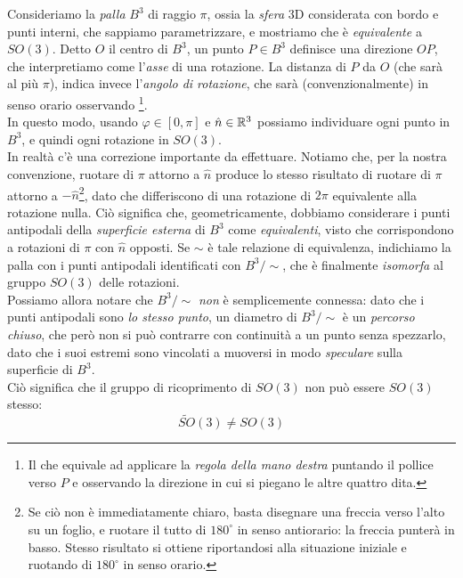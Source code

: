 \documentclass[../../FisicaTeorica.tex]{subfiles}
\begin{document}
Consideriamo la \textit{palla} $B^3$ di raggio $\pi$, ossia la \textit{sfera} 3D considerata con bordo e punti interni, che sappiamo parametrizzare, e mostriamo che è \textit{equivalente} a $SO(3)$. Detto $O$ il centro di $B^3$, un punto $P \in B^3$ definisce una direzione $OP$, che interpretiamo come l'\textit{asse} di una rotazione. La distanza di $P$ da $O$ (che sarà al più $\pi$), indica invece l'\textit{angolo di rotazione}, che sarà (convenzionalmente) in senso orario osservando \footnote{Il che equivale ad applicare la \textit{regola della mano destra} puntando il pollice verso $P$ e osservando la direzione in cui si piegano le altre quattro dita.}.\\
In questo modo, usando $\varphi \in [0,\pi]$ e $\hat{n} \in \mathbb{R}^3$ possiamo individuare ogni punto in $B^3$, e quindi ogni rotazione in $SO(3)$.\\
In realtà c'è una correzione importante da effettuare. Notiamo che, per la nostra convenzione, ruotare di $\pi$ attorno a $\hat{n}$ produce lo stesso risultato di ruotare di $\pi$ attorno a $-\hat{n}$\footnote{Se ciò non è immediatamente chiaro, basta disegnare una freccia verso l'alto su un foglio, e ruotare il tutto di $180^\circ$ in senso antiorario: la freccia punterà in basso. Stesso risultato si ottiene riportandosi alla situazione iniziale e ruotando di $180^\circ$ in senso orario.}, dato che differiscono di una rotazione di $2\pi$ equivalente alla rotazione nulla. Ciò significa che, geometricamente, dobbiamo considerare i punti antipodali della \textit{superficie esterna} di $B^3$ come \textit{equivalenti}, visto che corrispondono a rotazioni di $\pi$ con $\hat{n}$ opposti. Se $\sim$ è tale relazione di equivalenza, indichiamo la palla con i punti antipodali identificati con $B^3/\sim$, che è finalmente \textit{isomorfa} al gruppo $SO(3)$ delle rotazioni.\\
Possiamo allora notare che $B^3/\sim$ \textit{non} è semplicemente connessa: dato che i punti antipodali sono \textit{lo stesso punto}, un diametro di $B^3/\sim$ è un \textit{percorso chiuso}, che però non si può contrarre con continuità a un punto senza spezzarlo, dato che i suoi estremi sono vincolati a muoversi in modo \textit{speculare}  sulla superficie di $B^3$.\\
Ciò significa che il gruppo di ricoprimento di $SO(3)$ non può essere $SO(3)$ stesso:
\[
\widetilde{SO}(3) \neq SO(3)
\]
\end{document}
